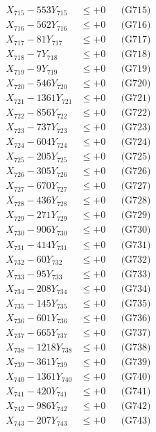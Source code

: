 \documentclass[a4paper,10pt]{article}
\begin{document}
{\begin{align}
X_{715} - 553Y_{715} &\leq +0 && \text{(G715)} \\
X_{716} - 562Y_{716} &\leq +0 && \text{(G716)} \\
X_{717} - 81Y_{717} &\leq +0 && \text{(G717)} \\
X_{718} - 7Y_{718} &\leq +0 && \text{(G718)} \\
X_{719} - 9Y_{719} &\leq +0 && \text{(G719)} \\
X_{720} - 546Y_{720} &\leq +0 && \text{(G720)} \\
\allowbreak
X_{721} - 1361Y_{721} &\leq +0 && \text{(G721)} \\
X_{722} - 856Y_{722} &\leq +0 && \text{(G722)} \\
X_{723} - 737Y_{723} &\leq +0 && \text{(G723)} \\
X_{724} - 604Y_{724} &\leq +0 && \text{(G724)} \\
X_{725} - 205Y_{725} &\leq +0 && \text{(G725)} \\
X_{726} - 305Y_{726} &\leq +0 && \text{(G726)} \\
X_{727} - 670Y_{727} &\leq +0 && \text{(G727)} \\
X_{728} - 436Y_{728} &\leq +0 && \text{(G728)} \\
X_{729} - 271Y_{729} &\leq +0 && \text{(G729)} \\
X_{730} - 906Y_{730} &\leq +0 && \text{(G730)} \\
\allowbreak
X_{731} - 414Y_{731} &\leq +0 && \text{(G731)} \\
X_{732} - 60Y_{732} &\leq +0 && \text{(G732)} \\
X_{733} - 95Y_{733} &\leq +0 && \text{(G733)} \\
X_{734} - 208Y_{734} &\leq +0 && \text{(G734)} \\
X_{735} - 145Y_{735} &\leq +0 && \text{(G735)} \\
X_{736} - 601Y_{736} &\leq +0 && \text{(G736)} \\
X_{737} - 665Y_{737} &\leq +0 && \text{(G737)} \\
X_{738} - 1218Y_{738} &\leq +0 && \text{(G738)} \\
X_{739} - 361Y_{739} &\leq +0 && \text{(G739)} \\
X_{740} - 1361Y_{740} &\leq +0 && \text{(G740)} \\
\allowbreak
X_{741} - 420Y_{741} &\leq +0 && \text{(G741)} \\
X_{742} - 986Y_{742} &\leq +0 && \text{(G742)} \\
X_{743} - 207Y_{743} &\leq +0 && \text{(G743)} \\

\end{align}}
\end{document}

